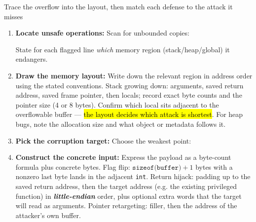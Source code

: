 \documentclass[12pt, a4paper]{article}
\newcommand{\term}[1]{\textbf{\textit{#1}}}        %
\newcommand{\imp}[1]{\hl{#1}}                       %
\begin{document}
\begin{schemebox}{Trace the overflow into the layout, then match each defense to the attack it misses}
\begin{enumerate}[label=\textbf{Step \arabic*:}, leftmargin=*]
    \item \textbf{Locate unsafe operations:} Scan for unbounded copies:  State for each flagged line \emph{which} memory region (stack/heap/global) it endangers.
    \item \textbf{Draw the memory layout:} Write down the relevant region in address order using the stated conventions. Stack growing down: arguments, saved return address, saved frame pointer, then locals; record exact byte counts and the pointer size (4 or 8 bytes). Confirm which local sits adjacent to the overflowable buffer --- \imp{the layout decides which attack is shortest}. For heap bugs, note the allocation size and what object or metadata follows it.
    \item \textbf{Pick the corruption target:} Choose the weakest point: 
    \item \textbf{Construct the concrete input:} Express the payload as a byte-count formula plus concrete bytes. Flag flip: $\texttt{sizeof(buffer)} + 1$ bytes with a nonzero last byte lands in the adjacent \texttt{int}. Return hijack: padding up to the saved return address, then the target address (e.g. the existing privileged function) in \term{little-endian} order, plus optional extra words that the target will read as arguments. Pointer retargeting: filler, then the address of the attacker's own buffer.

\end{enumerate}
\end{schemebox}
\end{document}
